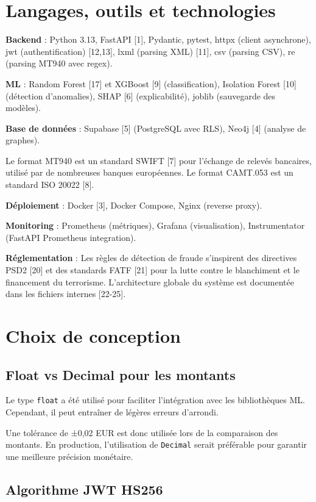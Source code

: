 \documentclass[12pt,a4paper]{extreport}
\begin{document}
\section{Langages, outils et technologies}

\textbf{Backend} : Python 3.13, FastAPI [1], Pydantic, pytest, httpx (client asynchrone), jwt (authentification) [12,13], lxml (parsing XML) [11], csv (parsing CSV), re (parsing MT940 avec regex).

\textbf{ML} : Random Forest [17] et XGBoost [9] (classification), Isolation Forest [10] (détection d'anomalies), SHAP [6] (explicabilité), joblib (sauvegarde des modèles).

\textbf{Base de données} : Supabase [5] (PostgreSQL avec RLS), Neo4j [4] (analyse de graphes).

Le format MT940 est un standard SWIFT [7] pour l'échange de relevés bancaires, utilisé par de nombreuses banques européennes. Le format CAMT.053 est un standard ISO 20022 [8].

\textbf{Déploiement} : Docker [3], Docker Compose, Nginx (reverse proxy).

\textbf{Monitoring} : Prometheus (métriques), Grafana (visualisation), Instrumentator (FastAPI Prometheus integration).

\textbf{Réglementation} : Les règles de détection de fraude s'inspirent des directives PSD2 [20] et des standards FATF [21] pour la lutte contre le blanchiment et le financement du terrorisme. L'architecture globale du système est documentée dans les fichiers internes [22-25].

\section{Choix de conception}

\subsection{Float vs Decimal pour les montants}

Le type \texttt{float} a été utilisé pour faciliter l'intégration avec les bibliothèques ML. Cependant, il peut entraîner de légères erreurs d'arrondi.

Une tolérance de ±0,02 EUR est donc utilisée lors de la comparaison des montants. En production, l'utilisation de \texttt{Decimal} serait préférable pour garantir une meilleure précision monétaire.

\subsection{Algorithme JWT HS256}
\end{document}

